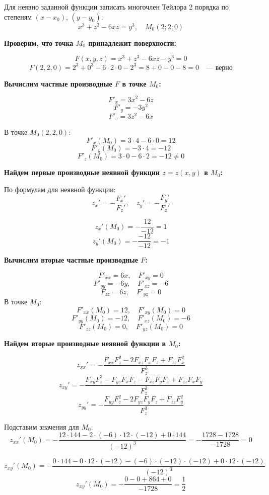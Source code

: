 \begin{problem}
Для неявно заданной функции записать многочлен Тейлора 2 порядка по степеням \( (x-x_0) \), \( (y-y_0) \):
\[ x^3+z^3-6xz=y^3, \quad M_0(2;2;0) \]
\end{problem}

\begin{solution}
  \textbf{Проверим, что точка \( M_0 \) принадлежит поверхности:}

\[ F(x,y,z) = x^3 + z^3 - 6xz - y^3 = 0 \]
\[ F(2,2,0) = 2^3 + 0^3 - 6 \cdot 2 \cdot 0 - 2^3 = 8 + 0 - 0 - 8 = 0 \quad \text{--- верно} \]

\textbf{Вычислим частные производные \( F \) в точке \( M_0 \):}

\[ F'_x = 3x^2 - 6z \]
\[ F'_y = -3y^2\]
\[ F'_z = 3z^2 - 6x\]

В точке \( M_0(2,2,0) \):
\[ F'_x(M_0) = 3 \cdot 4 - 6 \cdot 0 = 12 \]
\[ F'_y(M_0) = -3 \cdot 4 = -12 \]
\[ F'_z(M_0) = 3 \cdot 0 - 6 \cdot 2 = -12 \neq 0 \]

\textbf{Найдем первые производные неявной функции \( z = z(x,y) \) в \( M_0 \):}

По формулам для неявной функции:
\[ z_x' = -\frac{F_x'}{F_z'}, \quad z_y' = -\frac{F_y'}{F_z'} \]

\[ z_x'(M_0) = -\frac{12}{-12} = 1 \]
\[ z_y'(M_0) = -\frac{-12}{-12} = -1 \]

\textbf{Вычислим вторые частные производные \( F \):}

\[ F'_{xx} = 6x, \quad F'_{xy} = 0\]
\[ F'_{yy} = -6y, \quad F'_{xz} = -6\]
\[ F_{zz} = 6z, \quad F'_{yz} = 0\]
В точке \( M_0 \):
\[ F'_{xx}(M_0) = 12, \quad F'_{xy}(M_0) = 0\] 
\[ F'_{yy}(M_0) = -12, \quad F'_{xz}(M_0) = -6\]
\[ F'_{zz}(M_0) = 0, \quad F'_{yz}(M_0) = 0\]

\textbf{Найдем вторые производные неявной функции в \( M_0 \):}

\[ z_{xx}' = -\frac{F_{xx}F_z^2 - 2F_{xz}F_xF_z + F_{zz}F_x^2}{F_z^3} \]
\[ z_{xy}' = -\frac{F_{xy}F_z^2 - F_{yz}F_xF_z - F_{xz}F_yF_z + F_{zz}F_xF_y}{F_z^3} \]
\[ z_{yy}' = -\frac{F_{yy}F_z^2 - 2F_{yz}F_yF_z + F_{zz}F_y^2}{F_z^3} \]

Подставим значения для \( M_0 \):
\[ z_{xx}'(M_0) = -\frac{12 \cdot 144 - 2 \cdot (-6) \cdot 12 \cdot (-12) + 0 \cdot 144}{(-12)^3} = -\frac{1728 - 1728}{-1728} = 0 \]

\[ z_{xy}'(M_0) = -\frac{0 \cdot 144 - 0 \cdot 12 \cdot (-12) - (-6) \cdot (-12) \cdot (-12) + 0 \cdot 12 \cdot (-12)}{(-12)^3} \]
\[ z_{xy}'(M_0) = -\frac{0 - 0 + 864 + 0}{-1728} = \frac{1}{2} \]


\end{solution}
